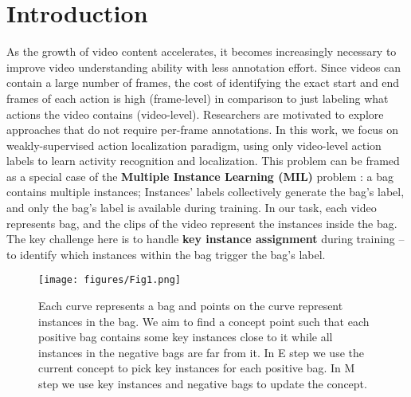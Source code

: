 \documentclass[runningheads]{llncs}
\begin{document}
\section{Introduction}
\label{sec:intro}
As the growth of video content accelerates, it becomes increasingly necessary to improve video understanding ability with less annotation effort. Since videos can contain a large number of frames, the cost of identifying the exact start and end frames of each action is high (frame-level) in comparison to just labeling what actions the video contains (video-level). Researchers are motivated to explore approaches that do not require per-frame annotations. In this work, we focus on weakly-supervised action localization paradigm, using only video-level action labels to learn activity recognition and localization. This problem can be framed as a special case of the \textbf{Multiple Instance Learning (MIL)} problem \cite{rectanglesMIL}: a bag contains multiple instances; Instances' labels collectively generate the bag's label, and only the bag's label is available during training. In our task, each video represents bag, and the clips of the video represent the instances inside the bag. The key challenge here is to handle \textbf{key instance assignment} during training -- to identify which instances within the bag trigger the bag's label.



\begin{figure}[t]
    \centering
    \texttt{[image: figures/Fig1.png]}
    \caption{Each curve represents a bag and points on the curve represent instances in the bag. We aim to find a concept point such that each positive bag contains some key instances close to it while all instances in the negative bags are far from it. In E step we use the current concept to pick key instances for each positive bag. In M step we use key instances and negative bags to update the concept.}
    \label{inituition}
\end{figure}
\end{document}
